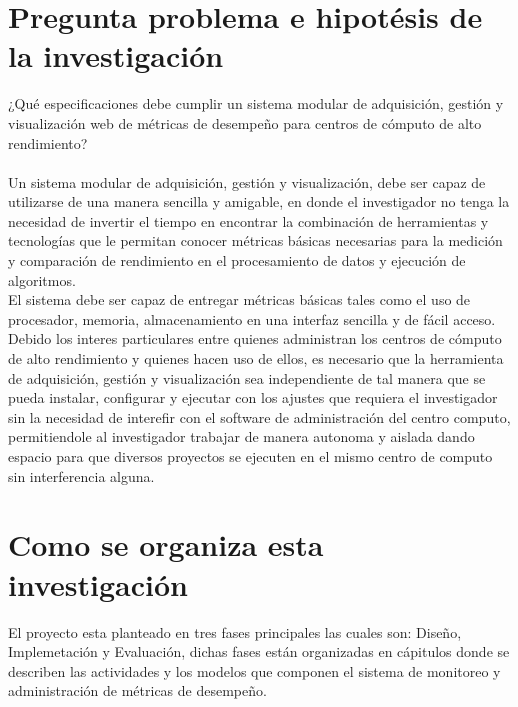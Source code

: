 \section{Pregunta problema e hipotésis de la investigación}
¿Qué especificaciones debe cumplir un sistema modular de adquisición, gestión y visualización web de métricas de desempeño para centros de cómputo de alto rendimiento?
\\\\
Un sistema modular de adquisición, gestión y visualización, debe ser capaz de utilizarse de una manera sencilla y amigable, en donde el investigador no tenga la necesidad de invertir el tiempo en encontrar la combinación de herramientas y tecnologías que le permitan conocer métricas básicas necesarias para la medición y comparación de rendimiento en el procesamiento de datos y ejecución de algoritmos. \\El sistema debe ser capaz de entregar métricas básicas tales como el uso de procesador, memoria, almacenamiento en una interfaz sencilla y de fácil acceso.
Debido los interes particulares entre quienes administran los centros de cómputo de alto rendimiento y quienes hacen uso de ellos, es necesario que la herramienta de adquisición, gestión y visualización sea independiente de tal manera que se pueda instalar, configurar y ejecutar con los ajustes que requiera el investigador sin la necesidad de interefir con el software de administración del centro computo, permitiendole al investigador trabajar de manera autonoma y aislada dando espacio para que diversos proyectos se ejecuten en el mismo centro de computo sin interferencia alguna.

\newpage

\section{Como se organiza esta investigación}

El proyecto esta planteado en tres fases principales las cuales son: Diseño, Implemetación y Evaluación, dichas fases están organizadas en cápitulos donde se describen las actividades y los modelos que componen el sistema de monitoreo y administración de métricas de desempeño.

